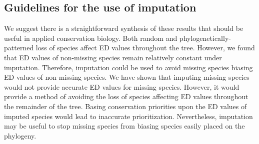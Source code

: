\documentclass[12pt,english]{article}
\begin{document}
\subsection*{Guidelines for the use of imputation}
We suggest there is a straightforward synthesis of these results that should be
useful in applied conservation biology. Both random and
phylogenetically-patterned loss of species affect ED values throughout the tree.
However, we found that ED values of non-missing species remain relatively
constant under imputation. Therefore, imputation could be used to avoid missing
species biasing ED values of non-missing species. We have shown that imputing
missing species would not provide accurate ED values for missing species.
However, it would provide a method of avoiding the loss of species affecting ED
values throughout the remainder of the tree. Basing conservation priorities upon
the ED values of imputed species would lead to inaccurate prioritization.
Nevertheless, imputation may be useful to stop missing species from biasing
species easily placed on the phylogeny.
\end{document}
